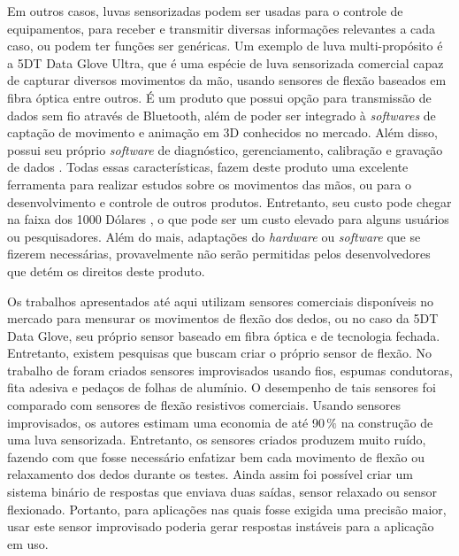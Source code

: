 \documentclass[
	12pt,				%
	openright,			%
	oneside,			%
	a4paper,			%
	english,			%
	brazil				%
	]{abntex2}
\begin{document}
		Em outros casos, luvas sensorizadas podem ser usadas para o controle de equipamentos, para receber e transmitir diversas informações relevantes a cada caso, ou podem ter funções ser genéricas. Um exemplo de luva multi-propósito é a 5DT Data Glove Ultra, que é uma espécie de luva sensorizada comercial capaz de capturar diversos movimentos da mão, usando sensores de flexão baseados em fibra óptica entre outros. É um produto que possui opção para transmissão de dados sem fio através de Bluetooth, além de poder ser integrado à \textit{softwares} de captação de movimento e animação em 3D conhecidos no mercado. Além disso, possui seu próprio \textit{software} de diagnóstico, gerenciamento, calibração e gravação de dados \cite{5DT-ultra}. Todas essas características, fazem deste produto uma excelente ferramenta para realizar estudos sobre os movimentos das mãos, ou para o desenvolvimento e controle de outros produtos. Entretanto, seu custo pode chegar na faixa dos 1000 Dólares \cite{5DT-glove2019ebay}, o que pode ser um custo elevado para alguns usuários ou pesquisadores. Além do mais, adaptações do \textit{hardware} ou \textit{software} que se fizerem necessárias, provavelmente não serão permitidas pelos desenvolvedores que detém os direitos deste produto.

		Os trabalhos apresentados até aqui utilizam sensores comerciais disponíveis no mercado para mensurar os movimentos de flexão dos dedos, ou no caso da 5DT Data Glove, seu próprio sensor baseado em fibra óptica e de tecnologia fechada. Entretanto, existem pesquisas que buscam criar o próprio sensor de flexão. No trabalho de \cite{flores2014glovecontroller} foram criados sensores improvisados usando fios, espumas condutoras, fita adesiva e pedaços de folhas de alumínio. O desempenho de tais sensores foi comparado com sensores de flexão resistivos comerciais. Usando sensores improvisados, os autores estimam uma economia de até 90$\,\%$ na construção de uma luva sensorizada. Entretanto, os sensores criados produzem muito ruído, fazendo com que fosse necessário enfatizar bem cada movimento de flexão ou relaxamento dos dedos durante os testes. Ainda assim foi possível criar um sistema binário de respostas que enviava duas saídas, sensor relaxado ou sensor flexionado. Portanto, para aplicações nas quais fosse exigida uma precisão maior, usar este sensor improvisado poderia gerar respostas instáveis para a aplicação em uso.


\end{document}
